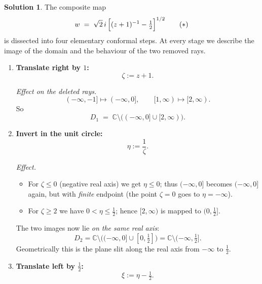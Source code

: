 \documentclass[12pt]{article}
\theoremstyle{definition} %
\newtheorem{solution}{Solution}
\theoremstyle{plain} %
\begin{document}
\begin{solution}
  The composite map
  \[
     w
     \;=\;
     \sqrt{2}\,i\,
     \Bigl[(z+1)^{-1}-\tfrac12\Bigr]^{1/2}
  \tag{$\ast$}\label{eq:full}
  \]
  is dissected into four elementary conformal steps.
  At every stage we describe the image of the domain and the behaviour of
  the two removed rays.
  
  \bigskip
  \begin{enumerate}[label=\textbf{Step~\arabic*.},wide,labelwidth=!,labelindent=0pt]
  
  \item \textbf{Translate right by $1$:}
        \[
           \zeta:=z+1.
        \]
  
        \emph{Effect on the deleted rays.}
        \[
           (-\infty,-1]\longmapsto(-\infty,0], 
           \qquad
           [1,\infty)\longmapsto[2,\infty).
        \]
        So
        \[
           D_1
           \;=\;
           \mathbb{C}\setminus\bigl((-\infty,0]\cup[2,\infty)\bigr).
        \]
  
  \item \textbf{Invert in the unit circle:}
        \[
           \eta:=\frac{1}{\zeta}.
        \]
  
        \emph{Effect.}
        \begin{itemize}
          \item For $\zeta\le 0$ (negative real axis) we get
                $\eta\le 0$; thus $(-\infty,0]$ becomes
                $(-\infty,0]$ again, but with \emph{finite} endpoint
                (the point $\zeta=0$ goes to $\eta=-\infty$).
          \item For $\zeta\ge 2$ we have $0<\eta\le\tfrac12$; hence
                $[2,\infty)$ is mapped to $\bigl(0,\tfrac12\bigr]$.
        \end{itemize}
        The two images now lie \emph{on the same real axis}:
        \[
           D_2
           =\mathbb{C}\setminus\bigl((-\infty,0]\cup[0,\tfrac12]\bigr)
           =\mathbb{C}\setminus(-\infty,\tfrac12].
        \]
        Geometrically this is the plane slit along the real axis from
        $-\infty$ to $\tfrac12$.
  
  \item \textbf{Translate left by $\tfrac12$:}
        \[
           \xi:=\eta-\tfrac12.
        \]
  

\end{enumerate}
\end{solution}
\end{document}
